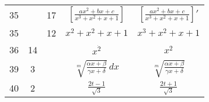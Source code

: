 \documentclass[a4paper,11pt]{article}
\begin{document}
\begin{center}
\begin{tabular}{|c|c|c|c|c|}
    35 & & 17 & $\left[ \frac{ a x^{ 2 } + b x + c }
                 { x^{ 3 } + x^{ 2 } + x + 1 } \right]$
           & $\left[ \frac{ a x^{ 2 } + b x + c }
             { x^{ 3 } + x^{ 2 } + x + 1 } \right]'$ \\
    35 & & 12 & $x^{ 2 } + x^{ 2 } + x + 1$
           & $x^{ 3 } + x^{ 2 } + x + 1$ \\
    36 & 14 & & $x^{ \dot{ 2 } }$ & $x^{ 2 }$ \\
    39 & \hphantom{0}3 & & $\sqrt[ m ]{
                 \frac{ \alpha x + \beta }{ \gamma x + \delta } } \, dx$
           & $\sqrt[ m ]{
             \frac{ \alpha x + \beta }{ \gamma x + \delta } }$ \\
    40 & \hphantom{0}2 & & $\frac{ 2t - 1 }{ \sqrt{ 3 } }$
           & $\frac{ 2t + 1 }{ \sqrt{ 3 } }$ \\
    \hline
  \end{tabular}





  \newpage


\end{center}
\end{document}

